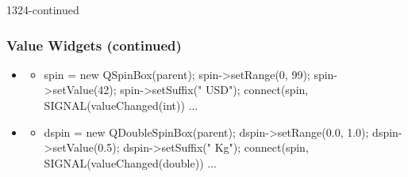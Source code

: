 \begin{slide}[fragile]{1324-continued}
  \frametitle{Value Widgets (continued)}
 \begin{itemize}
 \item \textbf{}
   \begin{itemize}
    \item[]
      \begin{cpp}
spin = new QSpinBox(parent);
spin->setRange(0, 99);
spin->setValue(42);
spin->setSuffix(" USD");
connect(spin, SIGNAL(valueChanged(int)) ...
      \end{cpp}
  \end{itemize}
 \item \textbf{}
   \begin{itemize}
    \item[]
      \begin{cpp}
dspin = new QDoubleSpinBox(parent);
dspin->setRange(0.0, 1.0);
dspin->setValue(0.5);
dspin->setSuffix(" Kg");
connect(spin, SIGNAL(valueChanged(double)) ...
      \end{cpp}
  \end{itemize} \end{itemize}
\end{slide}


